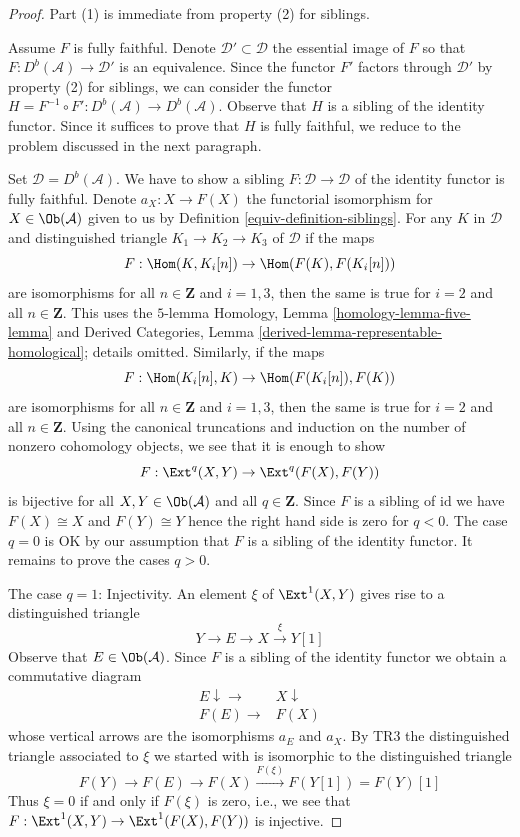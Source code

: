 \begin{proof}

Part (1) is immediate from property (2) for siblings.

\medskip\noindent
Assume $F$ is fully faithful. Denote $\mathcal{D}' \subset \mathcal{D}$
the essential image of $F$ so that $F : D^b(\mathcal{A}) \to \mathcal{D}'$
is an equivalence. Since the functor $F'$ factors through $\mathcal{D}'$
by property (2) for siblings, we can consider the functor
$H = F^{-1} \circ F' : D^b(\mathcal{A}) \to D^b(\mathcal{A})$.
Observe that $H$ is a sibling of the identity functor.
Since it suffices to prove that $H$ is fully faithful,
we reduce to the problem discussed in the next paragraph.

\medskip\noindent
Set $\mathcal{D} = D^b(\mathcal{A})$. We have to show a sibling
$F : \mathcal{D} \to \mathcal{D}$ of the identity functor is fully faithful.
Denote $a_X : X \to F(X)$ the functorial isomorphism for
$X \in \Ob(\mathcal{A})$ given to us by Definition \ref{equiv-definition-siblings}.
For any $K$ in $\mathcal{D}$ and distinguished triangle
$K_1 \to K_2 \to K_3$ of $\mathcal{D}$
if the maps
$$
F : \Hom(K, K_i[n]) \to \Hom(F(K), F(K_i[n]))
$$
are isomorphisms for all $n \in \mathbf{Z}$ and $i = 1, 3$, then the
same is true for $i = 2$ and all $n \in \mathbf{Z}$. This uses the
$5$-lemma Homology, Lemma \ref{homology-lemma-five-lemma} and
Derived Categories, Lemma \ref{derived-lemma-representable-homological};
details omitted. Similarly, if the maps
$$
F : \Hom(K_i[n], K) \to \Hom(F(K_i[n]), F(K))
$$
are isomorphisms for all $n \in \mathbf{Z}$ and $i = 1, 3$, then the
same is true for $i = 2$ and all $n \in \mathbf{Z}$. Using the canonical
truncations and induction on the number of nonzero cohomology objects,
we see that it is enough to show
$$
F : \Ext^q(X, Y) \to \Ext^q(F(X), F(Y))
$$
is bijective for all $X, Y \in \Ob(\mathcal{A})$ and all $q \in \mathbf{Z}$.
Since $F$ is a sibling of $\text{id}$ we have $F(X) \cong X$ and
$F(Y) \cong Y$ hence the right hand side is zero for $q < 0$.
The case $q = 0$ is OK by our assumption that $F$ is a sibling of
the identity functor. It remains to prove the cases $q > 0$.

\medskip\noindent
The case $q = 1$: Injectivity. An element $\xi$ of $\Ext^1(X, Y)$
gives rise to a distinguished triangle
$$
Y \to E \to X \xrightarrow{\xi} Y[1]
$$
Observe that $E \in \Ob(\mathcal{A})$. Since $F$ is a sibling of the
identity functor we obtain a commutative diagram
$$
\begin{array}{cc}E \downarrow\longrightarrow & X \downarrow \\ F(E) \longrightarrow & F(X)\end{array}
$$
whose vertical arrows are the isomorphisms $a_E$ and $a_X$.
By TR3 the distinguished triangle associated to $\xi$ we started
with is isomorphic to the distinguished triangle
$$
F(Y) \to F(E) \to F(X) \xrightarrow{F(\xi)} F(Y[1]) = F(Y)[1]
$$
Thus $\xi = 0$ if and only if $F(\xi)$ is zero, i.e., we see that
$F : \Ext^1(X, Y) \to \Ext^1(F(X), F(Y))$ is injective.


\end{proof}
